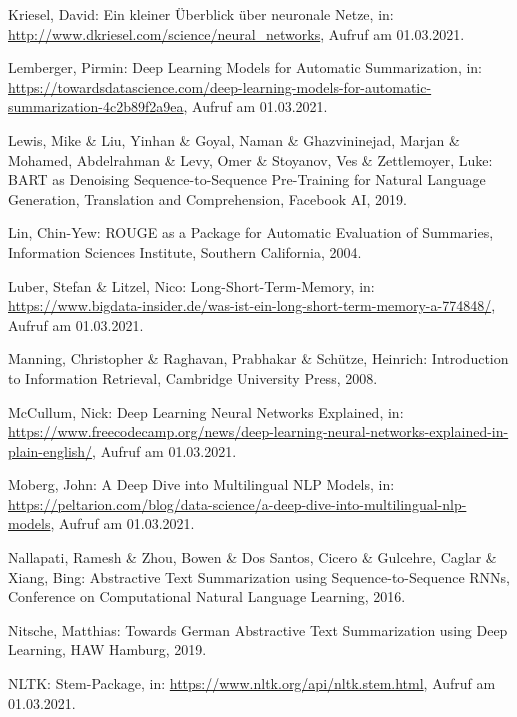 \begin{thebibliography}{85}
Kriesel, David: Ein kleiner Überblick über neuronale Netze, in: \url{http://www.dkriesel.com/science/neural_networks}, Aufruf am 01.03.2021.

Lemberger, Pirmin: Deep Learning Models for Automatic Summarization, in: \url{https://towardsdatascience.com/deep-learning-models-for-automatic-summarization-4c2b89f2a9ea}, Aufruf am 01.03.2021.

Lewis, Mike \& Liu, Yinhan \& Goyal, Naman \& Ghazvininejad, Marjan \& Mohamed, Abdelrahman \& Levy, Omer \& Stoyanov, Ves \& Zettlemoyer, Luke: BART as Denoising Sequence-to-Sequence Pre-Training for Natural
Language Generation, Translation and Comprehension, Facebook AI, 2019.

Lin, Chin-Yew: ROUGE as a Package for Automatic Evaluation of Summaries, Information Sciences Institute, Southern California, 2004.

Luber, Stefan \& Litzel, Nico: Long-Short-Term-Memory, in: \url{https://www.bigdata-insider.de/was-ist-ein-long-short-term-memory-a-774848/}, Aufruf am 01.03.2021.

Manning, Christopher \& Raghavan, Prabhakar \& Schütze, Heinrich: Introduction to Information Retrieval, Cambridge University Press, 2008.

McCullum, Nick: Deep Learning Neural Networks Explained, in: \url{https://www.freecodecamp.org/news/deep-learning-neural-networks-explained-in-plain-english/}, Aufruf am 01.03.2021.

Moberg, John: A Deep Dive into Multilingual NLP Models, in: \url{https://peltarion.com/blog/data-science/a-deep-dive-into-multilingual-nlp-models}, Aufruf am 01.03.2021.

Nallapati, Ramesh \& Zhou, Bowen \& Dos Santos, Cicero \& Gulcehre, Caglar \& Xiang, Bing: Abstractive Text Summarization using Sequence-to-Sequence RNNs, Conference on Computational Natural Language Learning, 2016.

Nitsche, Matthias: Towards German Abstractive Text Summarization using Deep Learning, HAW Hamburg, 2019.

NLTK: Stem-Package, in: \url{https://www.nltk.org/api/nltk.stem.html}, Aufruf am 01.03.2021.


\end{thebibliography}

